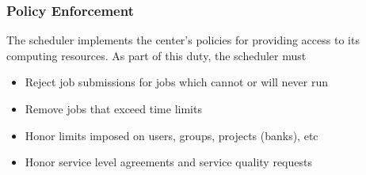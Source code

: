 \subsubsection{Policy Enforcement}

The scheduler implements the center's policies for providing access to
its computing resources.  As part of this duty, the scheduler must

\begin{itemize}
  \item Reject job submissions for jobs which cannot or will never run
  \item Remove jobs that exceed time limits
  \item Honor limits imposed on users, groups, projects (banks), etc
  \item Honor service level agreements and service quality requests
\end{itemize}

